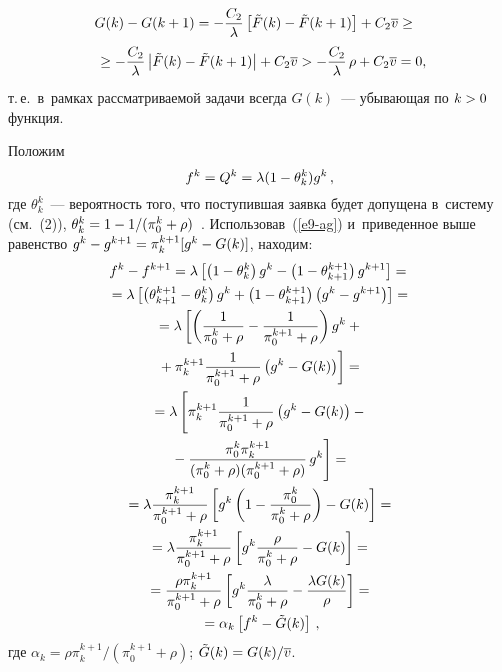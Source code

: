 \begin{multicols}{2}
\noindent
  \begin{multline*}
  \!\!\!G(k) -G(k+1) =-\displaystyle\frac{\displaystyle C_2\mathstrut}{\displaystyle \lambda\mathstrut}\left[ \tilde{F}(k) -\tilde{F}(k+1)\right] 
+C_2\overline{v}\geq{}\\
 \! {}\geq -\displaystyle\frac{\displaystyle C_2\mathstrut}{\displaystyle \lambda\mathstrut}\left\vert \tilde{F}(k) -\tilde{F}(k+1)\right\vert 
+C_2\overline{v} > -\displaystyle\frac{\displaystyle C_2\mathstrut}{\displaystyle \lambda\mathstrut}\,\rho +C_2\overline{v}=0,\hspace*{-4.64pt}
  \end{multline*}
т.\,е.\ в~рамках рассматриваемой задачи всегда $G(k)$~--- убывающая по 
$k\hm>0$ функция. 

  Положим 
  $$
  f^k=Q^k\hm= \lambda(1\hm- \theta_k^k)g^k\,,
  $$ 
  где $\theta_k^k$~--- 
вероятность того, что поступившая заявка будет допущена в~систему (см.~(2)), 
$\theta^k_k\hm= 1\hm- 1/(\pi_0^k+\rho)$~\cite{8-ag}.  
Использовав~(\ref{e9-ag}) и~приведенное выше равенство $g^k\hm- 
g^{k+1}\hm= \pi_k^{k+1}[g^k\hm- G(k)]$, находим:
  \begin{multline}
  f^k-f^{k+1}= \lambda\left[ \left(1-\theta^k_k\right) g^k -\left(1-
\theta_{k+1}^{k+1}\right) g^{k+1}\right]={}\\
  {}= \lambda\left[\left( \theta_{k+1}^{k+1} -\theta_k^k\right)g^k +\left(1-
\theta_{k+1}^{k+1}\right) \left( g^k-g^{k+1}\right)\right]={}\\
  {}=\lambda \left[ \left( \fr{1}{\pi_0^k+\rho}-\fr{1}{\pi_0^{k+1}+\rho}\right) 
g^k+{}\right.\\
\left.{}+ \pi_k^{k+1}\fr{1}{\pi_0^{k+1}+\rho}\left( g^k -G(k)\right)\right]={}\\
  {}=
  \lambda\left[ 
  \vphantom{\fr{\pi_0^k \pi_k^{k+1}}{(\pi_0^k+\rho) (\pi_0^{k+1}+\rho)}}
  \pi_k^{k+1}\fr{1}{\pi_0^{k+1}+\rho}\left( g^k -G(k)\right) -{}\right.\\
\left.  {}-
\fr{\pi_0^k \pi_k^{k+1}}{(\pi_0^k+\rho) (\pi_0^{k+1}+\rho)}\,g^k \right]={}\\
  {}=
  \lambda\fr{\pi_k^{k+1}}{\pi_0^{k+1}+\rho}\left[ g^k\left(1- 
\fr{\pi_0^k}{\pi_0^k+\rho}\right)-G(k)\right] ={}\\
{}= \lambda \fr{\pi_k^{k+1}} 
{\pi_0^{k+1}+\rho}\left[  g^k \fr{\rho}{\pi_0^k+\rho}-G(k)\right]={}\\
 {}= \fr{\rho \pi_k^{k+1}}{\pi_0^{k+1}+\rho}\left[g^k\fr{\lambda}{\pi_0^k+\rho}- 
\fr{\lambda G(k)}{\rho}\right] ={}\\
{}=\alpha_k \left[ f^k-\tilde{G}(k)\right]\,,
  \label{e11-ag}
  \end{multline}
где $\alpha_k=\rho\pi_k^{k+1}/(\pi_0^{k+1}+\rho)$; $\tilde{G}(k)\hm= 
G(k)/\overline{v}$. 
  

\end{multicols}
